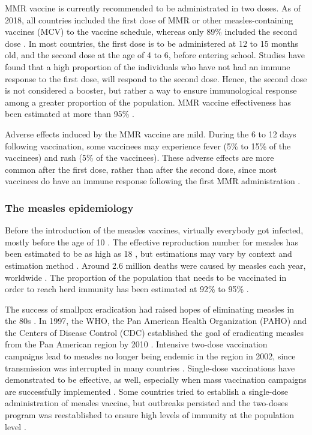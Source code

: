 MMR vaccine is currently recommended to be administrated in two doses. As of 2018, all countries included the first dose of MMR or other measles-containing vaccines (MCV) to the vaccine schedule, whereas only 89\% included the second dose \cite[]{Peck2018}. In most countries, the first dose is to be administered at 12 to 15 months old, and the second dose at the age of 4 to 6, before entering school. Studies have found that a high proportion of the individuals who have not had an immune response to the first dose, will respond to the second dose. Hence, the second dose is not considered a booster, but rather a way to ensure immunological response among a greater proportion of the population. MMR vaccine effectiveness has been estimated at more than 95\% \cite[]{Strebel2013}.

Adverse effects induced by the MMR vaccine are mild. During the 6 to 12 days following vaccination, some vaccinees may experience fever (5\% to 15\% of the vaccinees) and rash (5\% of the vaccinees). These adverse effects are more common after the first dose, rather than after the second dose, since most vaccinees do have an immune response following the first MMR administration \cite[]{Strebel2013}.

\subsubsection{The measles epidemiology}
\label{sec:MeaslesEpi}

Before the introduction of the measles vaccines, virtually everybody got infected, mostly before the age of 10 \cite[]{Strebel2013}. The effective reproduction number for measles has been estimated to be as high as 18 \cite[]{Anderson1992}, but estimations may vary by context and estimation method \cite[]{Guerra2017}. Around 2.6 million deaths were caused by measles each year, worldwide \cite[]{WHO_Factsheet_Measles}. The proportion of the population that needs to be vaccinated in order to reach herd immunity has been estimated at 92\% to 95\% \cite[]{Strebel2013}. 

The success of smallpox eradication had raised hopes of eliminating measles in the 80s \cite[]{Hopkins1982}. In 1997, the WHO, the Pan American Health Organization (PAHO) and the Centers of Disease Control (CDC) established the goal of eradicating measles from the Pan American region by 2010 \cite[]{MMWR_MeaslesErradication1997}. Intensive two-dose vaccination campaigns lead to measles no longer being endemic in the region in 2002, since transmission was interrupted in many countries \cite[]{Sever2011,DeQuadros2004}. 
%
Single-dose vaccinations have demonstrated to be effective, as well, especially when mass vaccination campaigns are successfully implemented \cite[]{Sever2011}. Some countries tried to establish a single-dose administration of measles vaccine, but outbreaks persisted and the two-doses program was reestablished to ensure high levels of immunity at the population level \cite[]{Strebel2013}. 

